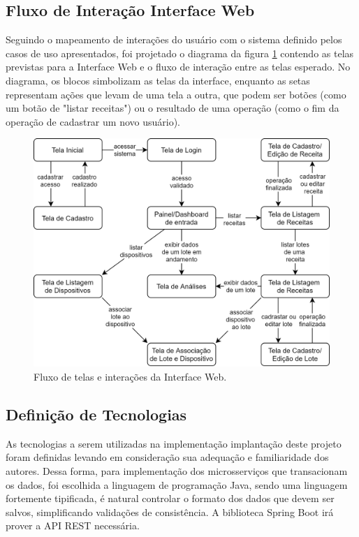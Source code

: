 \subsection{Fluxo de Interação Interface Web}


Seguindo o mapeamento de interações do usuário com o sistema definido pelos casos de uso apresentados, foi projetado o diagrama da figura \ref{fig:fluxo_interface} contendo as telas previstas para a Interface Web e o fluxo de interação entre as telas esperado. No diagrama, os blocos simbolizam as telas da interface, enquanto as setas representam ações que levam de uma tela a outra, que podem ser botões (como um botão de "listar receitas") ou o resultado de uma operação (como o fim da operação de cadastrar um novo usuário).


\begin{figure}[H]
    \centering
    \includegraphics[scale=1.0]{figuras/projeto/software/fluxo_interface.png}
    \caption{Fluxo de telas e interações da Interface Web.}
    \label{fig:fluxo_interface}
\end{figure}

\subsection{Definição de Tecnologias}

As tecnologias a serem utilizadas na implementação implantação deste projeto foram definidas levando em consideração sua adequação e familiaridade dos autores. Dessa forma, para implementação dos microsserviços que transacionam os dados, foi escolhida a linguagem de programação Java, sendo uma linguagem fortemente tipificada, é natural controlar o formato dos dados que devem ser salvos, simplificando validações de consistência. A biblioteca Spring Boot irá prover a API REST necessária. 


